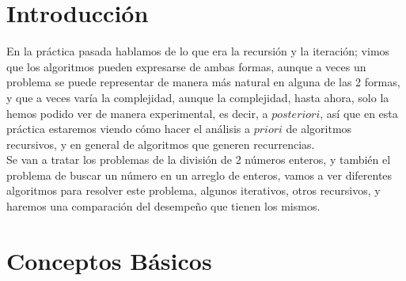 \documentclass[12pt,twoside]{article}
\begin{document}
\section{Introducci\'on}
En la práctica pasada hablamos de lo que era la recursión y la iteración; vimos que los algoritmos pueden expresarse de ambas formas, aunque a veces un problema se puede representar de manera más natural en alguna de las 2 formas, y que a veces varía la complejidad, aunque la complejidad, hasta ahora, solo la hemos podido ver de manera experimental, es decir, a $posteriori$, así que en esta práctica estaremos viendo cómo hacer el análisis a $priori$ de algoritmos recursivos, y en general de algoritmos que generen recurrencias.
\\ Se van a tratar los problemas de la división de 2 números enteros, y también el problema de buscar un número en un arreglo de enteros, vamos a ver diferentes algoritmos para resolver este problema, algunos iterativos, otros recursivos, y haremos una comparación del desempeño que tienen los mismos.
\section{Conceptos B\'asicos}
\end{document}
